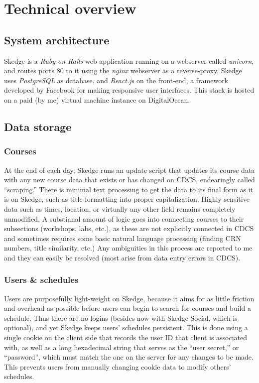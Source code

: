 
\chapter{Technical overview}

\section{System architecture}

Skedge is a \emph{Ruby on Rails} web application running on a webserver called \emph{unicorn}, and routes ports 80 to it using the \emph{nginx} webserver as a reverse-proxy. Skedge uses \emph{PostgreSQL} as database, and \emph{React.js} on the front-end, a framework developed by Facebook for making responsive user interfaces. This stack is hosted on a paid (by me) virtual machine instance on DigitalOcean. 

\section{Data storage}

\subsection{Courses}

At the end of each day, Skedge runs an update script that updates its course data with any new course data that exists or has changed on CDCS, endearingly called ``scraping.'' There is minimal text processing to get the data to its final form as it is on Skedge, such as title formatting into proper capitalization. Highly sensitive data such as times, location, or virtually any other field remains completely unmodified. A substianal amount of logic goes into connecting courses to their subsections (workshops, labs, etc.), as these are not explicitly connected in CDCS and sometimes requires some basic natural language processing (finding CRN numbers, title similarity, etc.) Any ambiguities in this process are reported to me and they can easily be resolved (most arise from data entry errors in CDCS).

\subsection{Users \& schedules}

Users are purposefully light-weight on Skedge, because it aims for as little friction and overhead as possible before users can begin to search for courses and build a schedule. Thus there are no logins (besides now with Skedge Social, which is optional), and yet Skedge keeps users' schedules persistent. This is done using a single cookie on the client side that records the user ID that client is associated with, as well as a long hexadecimal string that serves as the ``user secret,'' or ``password'', which must match the one on the server for any changes to be made. This prevents users from manually changing cookie data to modify others' schedules.

